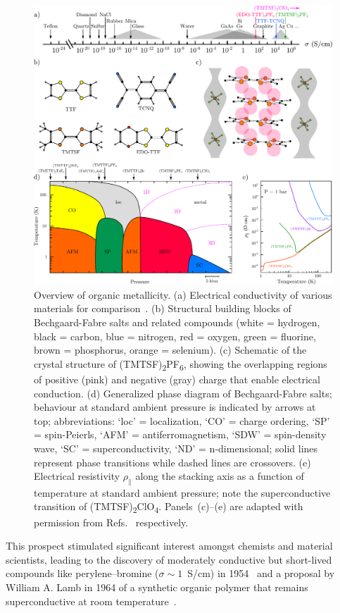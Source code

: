 \begin{figure}[ht!]
  \centering
  \includegraphics[width = \textwidth]{Figures/fig_EDO_overview.pdf}
  \caption[Overview of organic metallicity.]{
  Overview of organic metallicity.
  (a) Electrical conductivity of various materials for comparison~\cite{CRCHandbook, TTFBook}.
  (b) Structural building blocks of Bechgaard-Fabre salts and related compounds
  (white = hydrogen, black = carbon, blue = nitrogen, red = oxygen, green = fluorine, brown = phosphorus, orange = selenium).
  (c) Schematic of the crystal structure of (TMTSF)\textsubscript{2}PF\textsubscript{6},
  showing the overlapping regions of positive (pink) and negative (gray) charge
  that enable electrical conduction.
  (d) Generalized phase diagram of Bechgaard-Fabre salts;
  behaviour at standard ambient pressure is indicated by arrows at top;
  abbreviations: `loc' = localization, `CO' = charge ordering, `SP' = spin-Peierls,
  `AFM' = antiferromagnetism, `SDW' = spin-density wave, `SC' = superconductivity, `ND' = n-dimensional;
  solid lines represent phase transitions while dashed lines are crossovers.
  (e) Electrical resistivity $\rho_\parallel$ along the stacking axis
  as a function of temperature at standard ambient pressure;
  note the superconductive transition of (TMTSF)\textsubscript{2}ClO\textsubscript{4}.
  Panels~(c)--(e) are adapted with permission from
  Refs.~\cite{BechgaardJerome1982, Dressel2007, Jerome1982} respectively.
  }
  \label{fig: EDO-overview}
\end{figure}
%
This prospect stimulated significant interest amongst chemists and material scientists,
leading to the discovery of moderately conductive but short-lived compounds like perylene--bromine
($\sigma \sim 1$~S/cm) in 1954~\cite{Akamatu1954} and a proposal by William A. Lamb in 1964
of a synthetic organic polymer that remains superconductive at room temperature~\cite{Little1964}.

